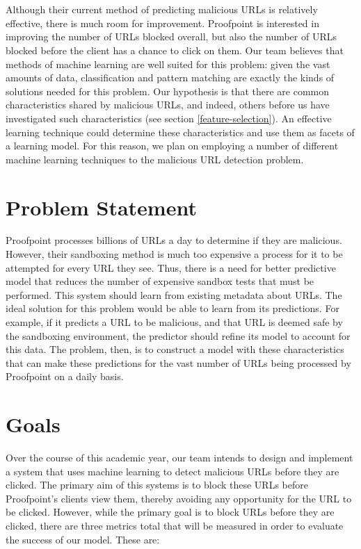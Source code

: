 \documentclass[cs,proposal]{hmcclinic}
\begin{document}
\\\\
Although their current method of predicting malicious URLs is relatively effective, there is much room for improvement. Proofpoint is interested in improving the number of URLs blocked overall, but also the number of URLs blocked before the client has a chance to click on them. Our team believes that methods of machine learning are well suited for this problem: given the vast amounts of data, classification and pattern matching are exactly the kinds of solutions needed for this problem. Our hypothesis is that there are common characteristics shared by malicious URLs, and indeed, others before us have investigated such characteristics (see section \ref{feature-selection}). An effective learning technique could determine these characteristics and use them as facets of a learning model. For this reason, we plan on employing a number of different machine learning techniques to the malicious URL detection problem.


\section{Problem Statement}

Proofpoint processes billions of URLs a day to determine if they are malicious. However, their sandboxing method is much too expensive a process for it to be attempted for every URL they see. Thus, there is a need for better predictive model that reduces the number of expensive sandbox tests that must be performed. This system should learn from existing metadata about URLs. The ideal solution for this problem would be able to learn from its predictions. For example, if it predicts a URL to be malicious, and that URL is deemed safe by the sandboxing environment, the predictor should refine its model to account for this data. The problem, then, is to construct a model with these characteristics that can make these predictions for the vast number of URLs being processed by Proofpoint on a daily basis.


\section{Goals}

Over the course of this academic year, our team intends to design and implement a system that uses machine learning to detect malicious URLs before they are clicked. The primary aim of this systems is to block these URLs before Proofpoint's clients view them, thereby avoiding any opportunity for the URL to be clicked. However, while the primary goal is to block URLs before they are clicked, there are three metrics total that will be measured in order to evaluate the success of our model. These are:
\end{document}
